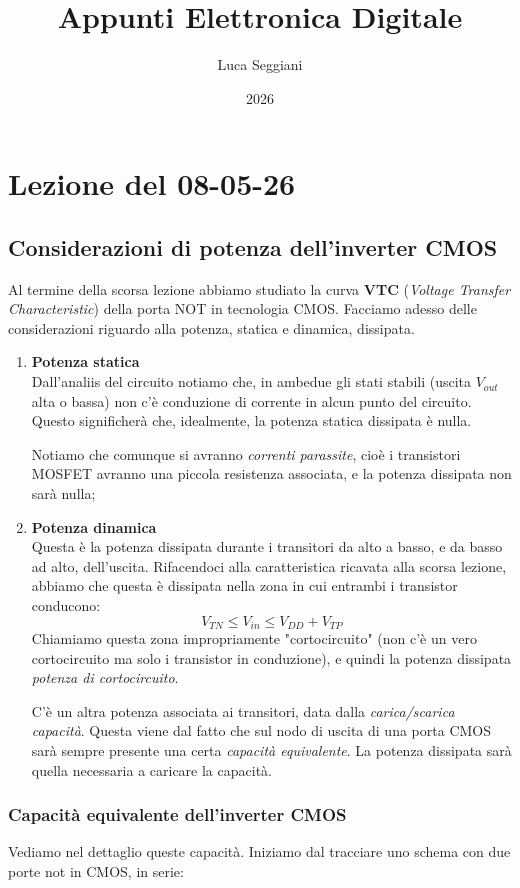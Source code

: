 \documentclass[a4paper,11pt]{article}
\title{Appunti Elettronica Digitale}
\author{Luca Seggiani}
\date{2026}
\begin{document}
\section{Lezione del 08-05-26}

\thispagestyle{empty}
\pagestyle{fancy}

\subsection{Considerazioni di potenza dell'inverter CMOS}
Al termine della scorsa lezione abbiamo studiato la curva \textbf{VTC} (\textit{Voltage Transfer Characteristic}) della porta NOT in tecnologia CMOS. Facciamo adesso delle considerazioni riguardo alla potenza, statica e dinamica, dissipata.

\begin{enumerate}
\item \textbf{\textsf{Potenza statica}} \\
	Dall'analiis del circuito notiamo che, in ambedue gli stati stabili (uscita $V_{out}$ alta o bassa) non c'è conduzione di corrente in alcun punto del circuito. Questo significherà che, idealmente, la potenza statica dissipata è nulla.

	Notiamo che comunque si avranno \textit{correnti parassite}, cioè i transistori MOSFET avranno una piccola resistenza associata, e la potenza dissipata non sarà nulla;

\item \textbf{\textsf{Potenza dinamica}} \\
	Questa è la potenza dissipata durante i transitori da alto a basso, e da basso ad alto, dell'uscita. Rifacendoci alla caratteristica ricavata alla scorsa lezione, abbiamo che questa è dissipata nella zona in cui entrambi i transistor conducono:
$$
V_{TN} \leq V_{in} \leq V_{DD} + V_{TP}
$$
Chiamiamo questa zona impropriamente "cortocircuito" (non c'è un vero cortocircuito ma solo i transistor in conduzione), e quindi la potenza dissipata \textit{potenza di cortocircuito}.

C'è un altra potenza associata ai transitori, data dalla \textit{carica/scarica capacità}. Questa viene dal fatto che sul nodo di uscita di una porta CMOS sarà sempre presente una certa \textit{capacità equivalente}. La potenza dissipata sarà quella necessaria a caricare la capacità.
\end{enumerate}

\subsubsection{Capacità equivalente dell'inverter CMOS}
Vediamo nel dettaglio queste capacità. Iniziamo dal tracciare uno schema con due porte not in CMOS, in serie:
\end{document}
